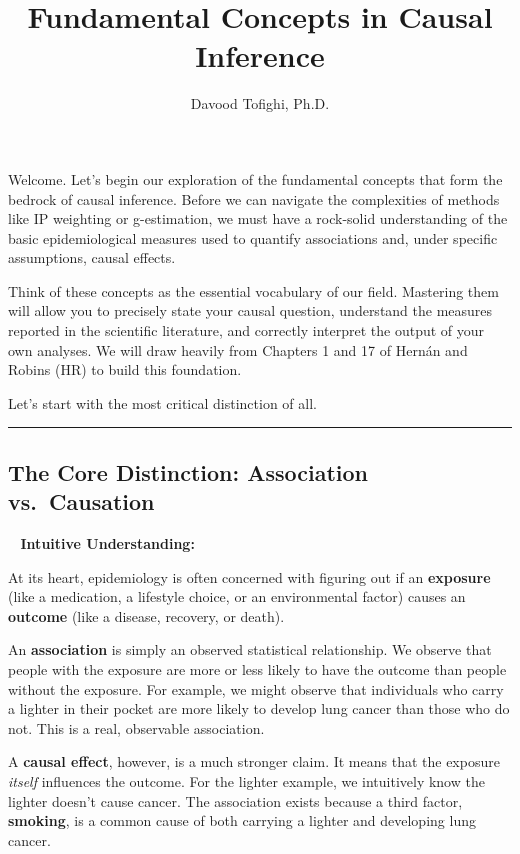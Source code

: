\documentclass[
  10pt,
  letterpaper,
  DIV=11,
  numbers=noendperiod]{scrartcl}
\title{Fundamental Concepts in Causal Inference}
\author{Davood Tofighi, Ph.D.}
\date{}
\begin{document}
\maketitle


Welcome. Let's begin our exploration of the fundamental concepts that
form the bedrock of causal inference. Before we can navigate the
complexities of methods like IP weighting or g-estimation, we must have
a rock-solid understanding of the basic epidemiological measures used to
quantify associations and, under specific assumptions, causal effects.

Think of these concepts as the essential vocabulary of our field.
Mastering them will allow you to precisely state your causal question,
understand the measures reported in the scientific literature, and
correctly interpret the output of your own analyses. We will draw
heavily from Chapters 1 and 17 of Hernán and Robins (HR) to build this
foundation.

Let's start with the most critical distinction of all.

\begin{center}\rule{0.5\linewidth}{0.5pt}\end{center}

\subsection{The Core Distinction: Association
vs.~Causation}\label{the-core-distinction-association-vs.-causation}

👨‍🏫 \textbf{Intuitive Understanding:}

At its heart, epidemiology is often concerned with figuring out if an
\textbf{exposure} (like a medication, a lifestyle choice, or an
environmental factor) causes an \textbf{outcome} (like a disease,
recovery, or death).

An \textbf{association} is simply an observed statistical relationship.
We observe that people with the exposure are more or less likely to have
the outcome than people without the exposure. For example, we might
observe that individuals who carry a lighter in their pocket are more
likely to develop lung cancer than those who do not. This is a real,
observable association.

A \textbf{causal effect}, however, is a much stronger claim. It means
that the exposure \emph{itself} influences the outcome. For the lighter
example, we intuitively know the lighter doesn't cause cancer. The
association exists because a third factor, \textbf{smoking}, is a common
cause of both carrying a lighter and developing lung cancer.
\end{document}

